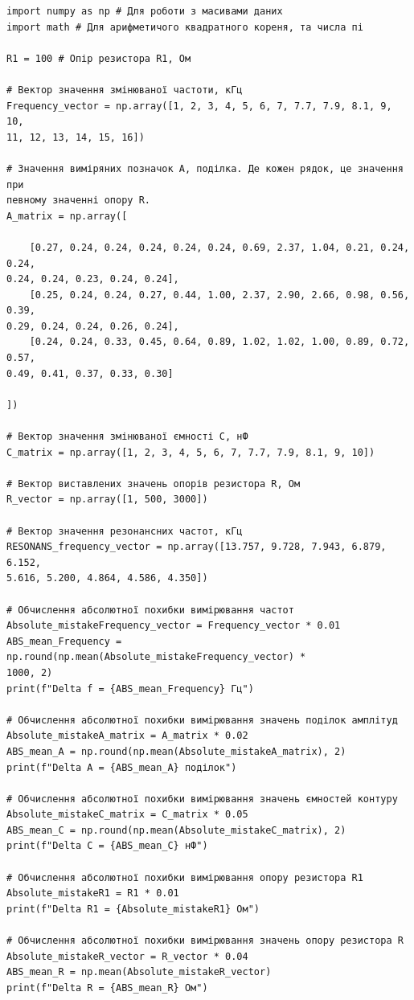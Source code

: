 \documentclass[12pt, a4paper]{article}
\begin{document}
    \small{

    \begin{verbatim}
import numpy as np # Для роботи з масивами даних
import math # Для арифметичого квадратного кореня, та числа пі

R1 = 100 # Опір резистора R1, Ом

# Вектор значення змінюваної частоти, кГц
Frequency_vector = np.array([1, 2, 3, 4, 5, 6, 7, 7.7, 7.9, 8.1, 9, 10,
11, 12, 13, 14, 15, 16])

# Значення виміряних позначок A, поділка. Де кожен рядок, це значення при
певному значенні опору R.
A_matrix = np.array([

    [0.27, 0.24, 0.24, 0.24, 0.24, 0.24, 0.69, 2.37, 1.04, 0.21, 0.24, 0.24,
0.24, 0.24, 0.23, 0.24, 0.24],
    [0.25, 0.24, 0.24, 0.27, 0.44, 1.00, 2.37, 2.90, 2.66, 0.98, 0.56, 0.39,
0.29, 0.24, 0.24, 0.26, 0.24],
    [0.24, 0.24, 0.33, 0.45, 0.64, 0.89, 1.02, 1.02, 1.00, 0.89, 0.72, 0.57,
0.49, 0.41, 0.37, 0.33, 0.30]

])

# Вектор значення змінюваної ємності C, нФ
С_matrix = np.array([1, 2, 3, 4, 5, 6, 7, 7.7, 7.9, 8.1, 9, 10])

# Вектор виставлених значень опорів резистора R, Ом
R_vector = np.array([1, 500, 3000])

# Вектор значення резонансних частот, кГц
RESONANS_frequency_vector = np.array([13.757, 9.728, 7.943, 6.879, 6.152,
5.616, 5.200, 4.864, 4.586, 4.350])

# Обчислення абсолютної похибки вимірювання частот
Absolute_mistakeFrequency_vector = Frequency_vector * 0.01
ABS_mean_Frequency = np.round(np.mean(Absolute_mistakeFrequency_vector) *
1000, 2)
print(f"Delta f = {ABS_mean_Frequency} Гц")

# Обчислення абсолютної похибки вимірювання значень поділок амплітуд
Absolute_mistakeA_matrix = A_matrix * 0.02
ABS_mean_A = np.round(np.mean(Absolute_mistakeA_matrix), 2)
print(f"Delta A = {ABS_mean_A} поділок")

# Обчислення абсолютної похибки вимірювання значень ємностей контуру
Absolute_mistakeC_matrix = С_matrix * 0.05
ABS_mean_C = np.round(np.mean(Absolute_mistakeC_matrix), 2)
print(f"Delta C = {ABS_mean_C} нФ")

# Обчислення абсолютної похибки вимірювання опору резистора R1
Absolute_mistakeR1 = R1 * 0.01
print(f"Delta R1 = {Absolute_mistakeR1} Ом")

# Обчислення абсолютної похибки вимірювання значень опору резистора R
Absolute_mistakeR_vector = R_vector * 0.04
ABS_mean_R = np.mean(Absolute_mistakeR_vector)
print(f"Delta R = {ABS_mean_R} Ом")


\end{verbatim}}
\end{document}
